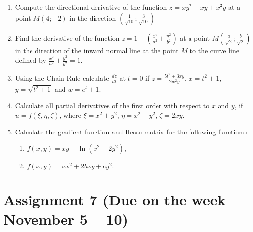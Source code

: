 \documentclass[12pt]{article} %
\theoremstyle{definition} %
\begin{document}
\begin{enumerate}

\item Compute the directional derivative of the function $z=xy^2-xy+x^3y$ at a point
$M (4; -2)$ in the direction $\left(\frac 1{\sqrt{10}};\frac 3{\sqrt{10}}\right)$ 

\item Find the derivative of the function $z=1-\left(\frac{x^2}{a^2}+\frac{y^2}{b^2}\right)$ at a point $M\left(\frac a{\sqrt{2}};\frac b{\sqrt{2}}\right)$  in the direction of the inward normal line at the point $M$ to the curve line defined by $\frac{x^2}{a^2}+\frac{y^2}{b^2}=1$.

\item Using the Chain Rule calculate $\frac{dz}{dt}$ at $t=0$ if $z=\frac{5t^2+3xy}{2w^2y}$, $x=t^2+1$, $y=\sqrt{t^2+1}$ and $w=e^t+1$.

\item Calculate all partial derivatives of the first order with respect to $x$ and $y$, if $u=f(\xi,\eta,\zeta)$, where $\xi=x^2+y^2$, $\eta=x^2-y^2$, $\zeta=2xy$.

\item Calculate the gradient function and Hesse matrix for the following functions:
 \begin{enumerate}
 \item $f(x,y)=xy-\ln (x^2+2y^2),$
 \item $f(x,y)=ax^2+2bxy+cy^2.$
 \end{enumerate}

\end{enumerate} 





\section{Assignment 7 (Due on the week November 5 – 10)}
\end{document}
